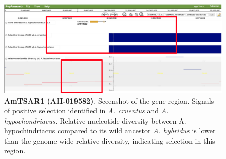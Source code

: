 \documentclass[9pt,twocolumn,twoside]{celabRxiv}
\begin{document}
\begin{figure}[ht]
\includegraphics[width=1\linewidth]{figures/Saponin_region_highlight.png}
\caption{\textbf{AmTSAR1 (AH-019582)}.  Sceenshot of the gene region. Signals of positive selection identified in \textit{A. cruentus} and \textit{A. hypochondriacus}. Relative nucleotide diversity between A. hypochindriacus compared to its wild ancestor \textit{A. hybridus} is lower than the genome wide relative diversity, indicating selection in this region.}
\label{fig:sponin_sup}
\end{figure}
\end{document}
